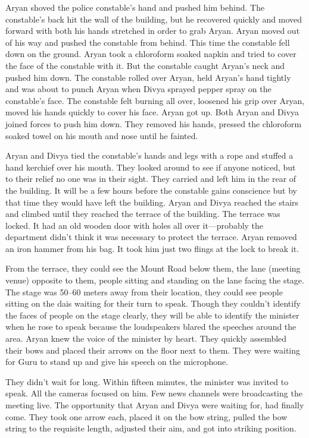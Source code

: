 Aryan shoved the police constable's hand and pushed him behind. The constable's
back hit the wall of the building, but he recovered quickly and moved forward
with both his hands stretched in order to grab Aryan. Aryan moved out of his way
and pushed the constable from behind. This time the constable fell down on the
ground. Aryan took a chloroform soaked napkin and tried to cover the face of the
constable with it. But the constable caught Aryan's neck and pushed him down.
The constable rolled over Aryan, held Aryan's hand tightly and was about to
punch Aryan when Divya sprayed pepper spray on the constable's face. The
constable felt burning all over, loosened his grip over Aryan, moved his hands
quickly to cover his face. Aryan got up. Both Aryan and Divya joined forces to
push him down. They removed his hands, pressed the chloroform soaked towel on
his mouth and nose until he fainted.

Aryan and Divya tied the constable's hands and legs with a rope and stuffed a
hand kerchief over his mouth. They looked around to see if anyone noticed, but
to their relief no one was in their sight. They carried and left him in the rear
of the building. It will be a few hours before the constable gains conscience
but by that time they would have left the building. Aryan and Divya reached the
stairs and climbed until they reached the terrace of the building. The terrace
was locked. It had an old wooden door with holes all over it—probably the
department didn't think it was necessary to protect the terrace. Aryan removed
an iron hammer from his bag. It took him just two flings at the lock to break
it.

From the terrace, they could see the Mount Road below them, the lane (meeting
venue) opposite to them, people sitting and standing on the lane facing the
stage. The stage was 50–60 meters away from their location, they could see
people sitting on the dais waiting for their turn to speak. Though they couldn't
identify the faces of people on the stage clearly, they will be able to identify
the minister when he rose to speak because the loudspeakers blared the speeches
around the area. Aryan knew the voice of the minister by heart. They quickly
assembled their bows and placed their arrows on the floor next to them. They
were waiting for Guru to stand up and give his speech on the microphone.

They didn't wait for long. Within fifteen minutes, the minister was invited to
speak. All the cameras focused on him. Few news channels were broadcasting the
meeting live. The opportunity that Aryan and Divya were waiting for, had finally
come. They took one arrow each, placed it on the bow string, pulled the bow
string to the requisite length, adjusted their aim, and got into striking
position.

